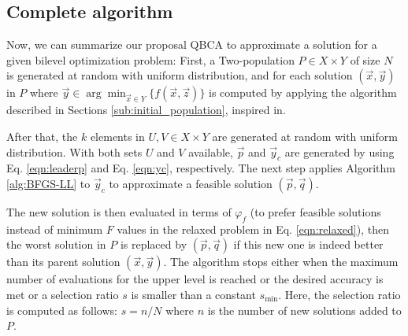 \documentclass[conference]{IEEEtran}
\theoremstyle{definition}
\begin{document}


\subsection{Complete algorithm}

Now, we can summarize our proposal QBCA to approximate a solution for a given bilevel
optimization problem: First, a Two-population $P \in X \times Y$ of size $N$ is
generated at random with uniform distribution, and for each solution $(\vec{x}, \vec{y})$
in $P$ where $\vec{y} \in \arg \min_{\vec{x}\in Y} \{ f(\vec{x},\vec{z})\}$
is computed by applying the algorithm described in Sections \ref{sub:initial_population}, inspired in\cite{Mejia2018}. 

After that, the $k$ elements in $U, V \in X\times Y$ are generated at random with
uniform distribution. With both sets $U$ and $V$ available, $\vec{p}$ and $\vec{y}_c$
are generated by using Eq. \ref{eqn:leaderp} and Eq. \ref{eqn:yc}, respectively.
The next step applies Algorithm \ref{alg:BFGS-LL} to $\vec{y}_c$ to approximate
a feasible solution $(\vec{p}, \vec{q})$. 

The new solution is then evaluated in terms of $\varphi_f$ (to prefer feasible
solutions instead of minimum $F$ values in the relaxed problem in Eq. \ref{eqn:relaxed}),
then the worst solution in $P$ is replaced by $(\vec{p}, \vec{q})$ if this new
one is indeed better than its parent solution $(\vec{x}, \vec{y})$. The algorithm
stops either when the maximum number of evaluations for the upper level is reached
or the desired accuracy is met or a selection ratio $s$ is smaller than a constant
$s_{\min}$. Here, the selection ratio is computed as follows: $ s = n /N$ where
$n$ is the number of new solutions added to $P$.
\end{document}
